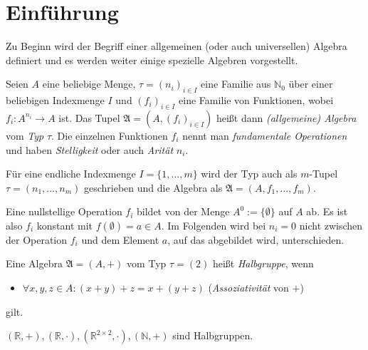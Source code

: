 \section{Einführung}

Zu Beginn wird der Begriff einer allgemeinen (oder auch universellen) Algebra definiert und es werden weiter einige spezielle Algebren vorgestellt.

\begin{definition}\label{def:algebra}\label{def:allg_algebra}
    Seien $A$ eine beliebige Menge, $\tau = (n_i)_{i \in I}$ eine Familie aus $\mathbb{N}_0$ über einer beliebigen Indexmenge $I$ und $(f_i)_{i \in I}$ eine Familie von Funktionen, wobei $f_i: A^{n_i} \to A$ ist. 
    Das Tupel $\mathfrak{A} = (A, (f_i)_{i \in I})$ heißt dann \emph{(allgemeine) Algebra} vom \emph{Typ} $\tau$. Die einzelnen Funktionen $f_i$ nennt man \emph{fundamentale Operationen} und haben \emph{Stelligkeit} oder auch \emph{Arität} $n_i$.
\end{definition}

\begin{remark}
    Für eine endliche Indexmenge $I = \{1, \ldots, m\}$ wird der Typ auch als $m$-Tupel $\tau = (n_1, \ldots, n_m)$ geschrieben und die Algebra als $\mathfrak{A} = (A, f_1, \ldots, f_m)$.
\end{remark}

\begin{remark}
    Eine nullstellige Operation $f_i$ bildet von der Menge $A^0 := \{\emptyset\}$ auf $A$ ab. Es ist also $f_i$ konstant mit $f(\emptyset) = a \in A$. Im Folgenden wird bei $n_i = 0$ nicht zwischen der Operation $f_i$ und dem Element $a$, auf das abgebildet wird, unterschieden.
\end{remark}

\begin{definition}\label{def:halbgruppe}
    Eine Algebra $\mathfrak{A} = (A, +)$ vom Typ $\tau = (2)$ heißt \emph{Halbgruppe}, wenn 
    \begin{itemize}[topsep=0pt, label={--}]
        \item $\forall x,y,z \in A: (x + y) + z = x + (y + z)$ \tab (\emph{Assoziativität} von $+$)
    \end{itemize}
    gilt.
\end{definition}

\begin{example} $(\mathbb{R}, +), (\mathbb{R}, \cdot), (\mathbb{R}^{2\times 2}, \cdot), (\mathbb{N}, +)$ sind Halbgruppen.
\end{example}

